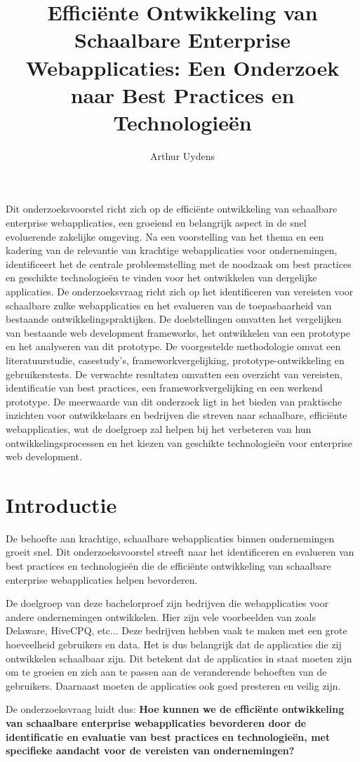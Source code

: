 \documentclass{hogent-article}
\title{Efficiënte Ontwikkeling van Schaalbare Enterprise Webapplicaties: Een Onderzoek naar Best Practices en Technologieën}
\author{Arthur Uydens }
\begin{document}
\begin{samenvatting}
  Dit onderzoeksvoorstel richt zich op de efficiënte ontwikkeling van schaalbare enterprise webapplicaties, een groeiend en belangrijk aspect in de snel evoluerende zakelijke omgeving. Na een voorstelling van het thema en een kadering van de relevantie van krachtige webapplicaties voor ondernemingen, identificeert het de centrale probleemstelling met de noodzaak om best practices en geschikte technologieën te vinden voor het ontwikkelen van dergelijke applicaties. De onderzoeksvraag richt zich op het identificeren van vereisten voor schaalbare zulke webapplicaties en het evalueren van de toepasbaarheid van bestaande ontwikkelingspraktijken. De doelstellingen omvatten het vergelijken van bestaande web development frameworks, het ontwikkelen van een prototype en het analyseren van dit prototype. De voorgestelde methodologie omvat een literatuurstudie, casestudy's, frameworkvergelijking, prototype-ontwikkeling en gebruikerstests. De verwachte resultaten omvatten een overzicht van vereisten, identificatie van best practices, een frameworkvergelijking en een werkend prototype. De meerwaarde van dit onderzoek ligt in het bieden van praktische inzichten voor ontwikkelaars en bedrijven die streven naar schaalbare, efficiënte webapplicaties, wat de doelgroep zal helpen bij het verbeteren van hun ontwikkelingsprocessen en het kiezen van geschikte technologieën voor enterprise web development.

\section*{Introductie}
De behoefte aan krachtige, schaalbare webapplicaties binnen ondernemingen groeit snel. Dit onderzoeksvoorstel streeft naar het identificeren en evalueren van best practices en technologieën die de efficiënte ontwikkeling van schaalbare enterprise webapplicaties helpen bevorderen.

De doelgroep van deze bachelorproef zijn bedrijven die webapplicaties voor andere ondernemingen ontwikkelen. Hier zijn vele voorbeelden van zoals Delaware, HiveCPQ, etc... Deze bedrijven hebben vaak te maken met een grote hoeveelheid gebruikers en data. Het is dus belangrijk dat de applicaties die zij ontwikkelen schaalbaar zijn. Dit betekent dat de applicaties in staat moeten zijn om te groeien en zich aan te passen aan de veranderende behoeften van de gebruikers. Daarnaast moeten de applicaties ook goed presteren en veilig zijn.

De onderzoeksvraag luidt dus: \textbf{
  Hoe kunnen we de efficiënte ontwikkeling van schaalbare enterprise webapplicaties bevorderen door de identificatie en evaluatie van best practices en technologieën, met specifieke aandacht voor de vereisten van ondernemingen?
}


\end{samenvatting}
\end{document}
